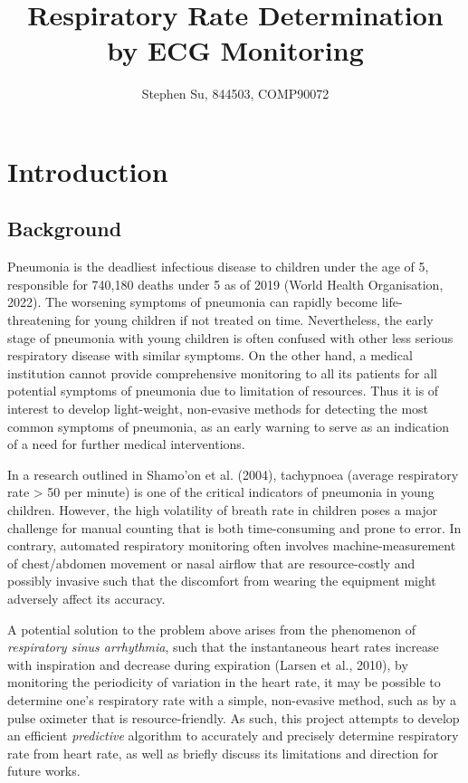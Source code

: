 \documentclass[
]{article}
\title{Respiratory Rate Determination by ECG Monitoring}
\author{Stephen Su, 844503, COMP90072}
\date{}
\begin{document}
\maketitle

\hypertarget{introduction}{%
\section{Introduction}\label{introduction}}

\hypertarget{background}{%
\subsection{Background}\label{background}}

Pneumonia is the deadliest infectious disease to children under the age
of 5, responsible for 740,180 deaths under 5 as of 2019 (World Health
Organisation, 2022). The worsening symptoms of pneumonia can rapidly
become life-threatening for young children if not treated on time.
Nevertheless, the early stage of pneumonia with young children is often
confused with other less serious respiratory disease with similar
symptoms. On the other hand, a medical institution cannot provide
comprehensive monitoring to all its patients for all potential symptoms
of pneumonia due to limitation of resources. Thus it is of interest to
develop light-weight, non-evasive methods for detecting the most common
symptoms of pneumonia, as an early warning to serve as an indication of
a need for further medical interventions.

In a research outlined in Shamo'on et al. (2004), tachypnoea (average
respiratory rate \textgreater{} 50 per minute) is one of the critical
indicators of pneumonia in young children. However, the high volatility
of breath rate in children poses a major challenge for manual counting
that is both time-consuming and prone to error. In contrary, automated
respiratory monitoring often involves machine-measurement of
chest/abdomen movement or nasal airflow that are resource-costly and
possibly invasive such that the discomfort from wearing the equipment
might adversely affect its accuracy.

A potential solution to the problem above arises from the phenomenon of
\emph{respiratory sinus arrhythmia}, such that the instantaneous heart
rates increase with inspiration and decrease during expiration (Larsen
et al., 2010), by monitoring the periodicity of variation in the heart
rate, it may be possible to determine one's respiratory rate with a
simple, non-evasive method, such as by a pulse oximeter that is
resource-friendly. As such, this project attempts to develop an
efficient \emph{predictive} algorithm to accurately and precisely
determine respiratory rate from heart rate, as well as briefly discuss
its limitations and direction for future works.
\end{document}
